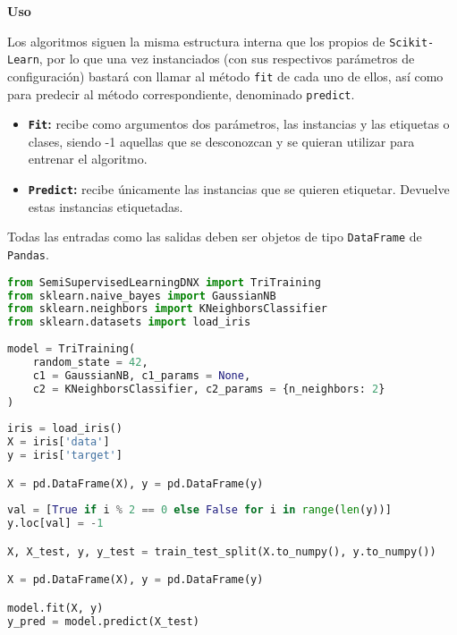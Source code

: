 \textbf{Uso}

Los algoritmos siguen la misma estructura interna que los propios de \texttt{Scikit-Learn}, por lo que una vez instanciados (con sus respectivos parámetros de configuración) bastará con llamar al método \texttt{fit} de cada uno de ellos, así como para predecir al método correspondiente, denominado \texttt{predict}.

\begin{itemize}
\item \textbf{\texttt{Fit}:} recibe como argumentos dos parámetros, las instancias y las etiquetas o clases, siendo -1 aquellas que se desconozcan y se quieran utilizar para entrenar el algoritmo.
\item \textbf{\texttt{Predict}:} recibe únicamente las instancias que se quieren etiquetar. Devuelve estas instancias etiquetadas.
\end{itemize}

Todas las entradas como las salidas deben ser objetos de tipo \texttt{DataFrame} de \texttt{Pandas}.

\begin{lstlisting}[language=Python, caption={Ejemplo de uso de IS-SSL}, label={lst:ejemplo}]
from SemiSupervisedLearningDNX import TriTraining
from sklearn.naive_bayes import GaussianNB
from sklearn.neighbors import KNeighborsClassifier
from sklearn.datasets import load_iris
	
model = TriTraining(
	random_state = 42,
	c1 = GaussianNB, c1_params = None,
	c2 = KNeighborsClassifier, c2_params = {n_neighbors: 2}
)
	
iris = load_iris()
X = iris['data']
y = iris['target']

X = pd.DataFrame(X), y = pd.DataFrame(y)
	
val = [True if i % 2 == 0 else False for i in range(len(y))]
y.loc[val] = -1

X, X_test, y, y_test = train_test_split(X.to_numpy(), y.to_numpy())

X = pd.DataFrame(X), y = pd.DataFrame(y)

model.fit(X, y)
y_pred = model.predict(X_test)
	
\end{lstlisting}